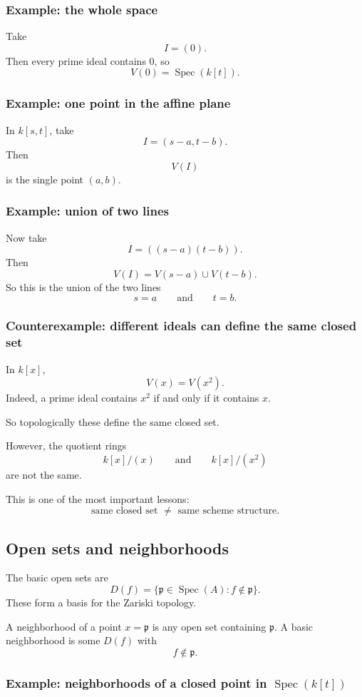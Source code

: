 \documentclass[12pt,a4paper]{article}
\theoremstyle{notespace}
\newcommand{\Spec}{\operatorname{Spec}}
\newcommand{\mf}{\mathfrak}
\theoremstyle{definition}
\begin{document}
\subsubsection{Example: the whole space}

Take
\[
I=(0).
\]
Then every prime ideal contains \(0\), so
\[
V(0)=\Spec(k[t]).
\]

\subsubsection{Example: one point in the affine plane}

In \(k[s,t]\), take
\[
I=(s-a,t-b).
\]
Then
\[
V(I)
\]
is the single point \((a,b)\).

\subsubsection{Example: union of two lines}

Now take
\[
I=((s-a)(t-b)).
\]
Then
\[
V(I)=V(s-a)\cup V(t-b).
\]
So this is the union of the two lines
\[
s=a
\qquad\text{and}\qquad
t=b.
\]

\subsubsection{Counterexample: different ideals can define the same closed set}

In \(k[x]\),
\[
V(x)=V(x^2).
\]
Indeed, a prime ideal contains \(x^2\) if and only if it contains \(x\).

So topologically these define the same closed set.

However, the quotient rings
\[
k[x]/(x)
\qquad\text{and}\qquad
k[x]/(x^2)
\]
are not the same.

This is one of the most important lessons:
\[
\text{same closed set } \neq \text{ same scheme structure}.
\]

\subsection{Open sets and neighborhoods}

The basic open sets are
\[
D(f)=\{\mf p\in \Spec(A): f\notin \mf p\}.
\]
These form a basis for the Zariski topology.

A neighborhood of a point \(x=\mf p\) is any open set containing \(\mf p\). A basic neighborhood is some \(D(f)\) with
\[
f\notin \mf p.
\]

\subsubsection{Example: neighborhoods of a closed point in \(\Spec(k[t])\)}
\end{document}
